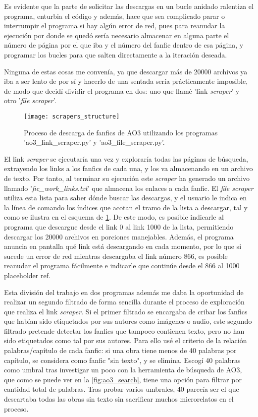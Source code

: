 \documentclass{pre-tfg}
\newcommand{\refToScraperExecution}{placeholder ref}
\begin{document}
Es evidente que la parte de solicitar las descargas en un bucle anidado ralentiza el programa, enturbia el código y además, hace que sea complicado parar o interrumpir el programa si hay algún error de red, pues para reanudar la ejecución por donde se quedó sería necesario almacenar en alguna parte el número de página por el que iba y el número del fanfic dentro de esa página, y programar los bucles para que salten directamente a la iteración deseada.

Ninguna de estas cosas me convenía, ya que descargar más de 20000 archivos ya iba a ser lento de por sí y hacerlo de una sentada sería prácticamente imposible, de modo que decidí dividir el programa en dos: uno que llamé 'link \textit{scraper}' y otro '\textit{file scraper}'.

\begin{figure}[h]
	\label{fig:scrapers_structure}
	\texttt{[image: scrapers\_structure]}
	\caption{Proceso de descarga de fanfics de AO3 utilizando los programas 'ao3\_link\_scraper.py' y 'ao3\_file\_scraper.py'.}
	\centering
\end{figure}

El link \textit{scraper} se ejecutaría una vez y exploraría todas las páginas de búsqueda, extrayendo los links a los fanfics de cada una, y los va almacenando en un archivo de texto. Por tanto, al terminar su ejecución este \textit{scraper} ha generado un archivo llamado '\textit{fic\_work\_links.txt}' que almacena los enlaces a cada fanfic. El \textit{file scraper} utiliza esta lista para saber dónde buscar las descargas, y el usuario le indica en la línea de comando los índices que acotan el tramo de la lista a descargar, tal y como se ilustra en el esquema de \ref{fig:scrapers_structure}. De este modo, es posible indicarle al programa que descargue desde el link 0 al link 1000 de la lista, permitiendo descargar los 20000 archivos en porciones manejables. Además, el programa anuncia en pantalla qué link está descargando en cada momento, por lo que si sucede un error de red mientras descargaba el link número 866, es posible reanudar el programa fácilmente e indicarle que continúe desde el 866 al 1000 \refToScraperExecution.

Esta división del trabajo en dos programas además me daba la oportunidad de realizar un segundo filtrado de forma sencilla durante el proceso de exploración que realiza el link \textit{scraper}. Si el primer filtrado se encargaba de cribar los fanfics que habían sido etiquetados por sus autores como imágenes o audio, este segundo filtrado pretende detectar los fanfics que tampoco contienen texto, pero no han sido etiquetados como tal por sus autores. Para ello usé el criterio de la relación palabras/capítulo de cada fanfic: si una obra tiene menos de 40 palabras por capítulo, se considera como fanfic "sin texto", y se elimina. Escogí 40 palabras como umbral tras investigar un poco con la herramienta de búsqueda de AO3, que como se puede ver en la \ref{fig:ao3_search}, tiene una opción para filtrar por cantidad total de palabras. Tras probar varios umbrales, 40 parecía ser el que descartaba todas las obras sin texto sin sacrificar muchos microrelatos en el proceso.
\end{document}
